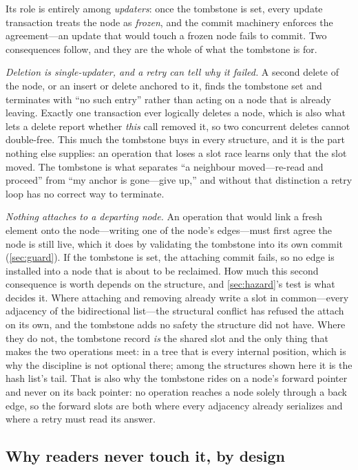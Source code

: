 \documentclass[11pt]{article}
\begin{document}
Its role is entirely among \emph{updaters}: once the tombstone is set, every
update transaction treats the node as \emph{frozen}, and the commit machinery
enforces the agreement---an update that would touch a frozen node fails to
commit. Two consequences follow, and they are the whole of what the tombstone is
for.

\emph{Deletion is single-updater, and a retry can tell why it failed.} A second
delete of the node, or an insert or delete anchored to it, finds the tombstone set
and terminates with ``no such entry'' rather than acting on a node that is already
leaving. Exactly one transaction ever logically deletes a node, which is also what
lets a delete report whether \emph{this} call removed it, so two concurrent
deletes cannot double-free. This much the tombstone buys in every structure, and
it is the part nothing else supplies: an operation that loses a slot race learns
only that the slot moved. The tombstone is what separates ``a neighbour
moved---re-read and proceed'' from ``my anchor is gone---give up,'' and without
that distinction a retry loop has no correct way to terminate.

\emph{Nothing attaches to a departing node.} An operation that would link a fresh
element onto the node---writing one of the node's edges---must first agree the
node is still live, which it does by validating the tombstone into its own commit
(\cref{sec:guard}). If the tombstone is set, the attaching commit fails, so no
edge is installed into a node that is about to be reclaimed. How much this second
consequence is worth depends on the structure, and \cref{sec:hazard}'s test is what
decides it. Where attaching and removing already write a slot in common---every
adjacency of the bidirectional list---the structural conflict has refused the
attach on its own, and the tombstone adds no safety the structure did not have.
Where they do not, the tombstone record \emph{is} the shared slot and the only
thing that makes the two operations meet: in a tree that is every internal
position, which is why the discipline is not optional there; among the structures
shown here it is the hash list's tail.
That is also why the tombstone rides on a node's forward pointer and never on its
back pointer: no operation reaches a node solely through a back edge, so the
forward slots are both where every adjacency already serializes and where a retry
must read its answer.

\subsection{Why readers never touch it, by design}
\label{sec:tombstoneplacement}
\end{document}
